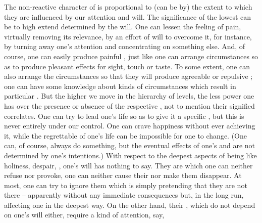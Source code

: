 The non-reactive character of  is proportional to (can be
 by) the extent to which they are influenced by our attention and
will.
\label{pa:SchelerZ}
The significance of the lowest  can be to high extend determined by
the will. One can lessen the feeling of pain, virtually removing its relevance,
by an effort of will to overcome it, for instance, by turning away one's
attention and concentrating on something else. And, of course, one can easily
produce painful , just like one can arrange circumstances so as
to produce pleasant effects for sight, touch or taste. To some extent, one can
also arrange the circumstances so that they will produce agreeable or repulsive
; one can have some knowledge about kinds of circumstances which
result in particular .  But the higher we move in the hierarchy of
levels, the less power one has over the presence or absence of the respective
, not to mention their signified correlates. One can try to lead one's
life so as to give it a specific , but this  is never
entirely under our control. One can crave happiness without ever achieving it,
while the regrettable  of one's life can be impossible for one to
change. (One can, of course, always do something, but the eventual effects of
one's  and  are not determined by one's intentions.) With
respect to the deepest aspects of being like holiness, despair, , one's
will has nothing to say. They are  which one can neither refuse nor
provoke, one can neither cause their  nor make them disappear. At
most, one can try to ignore them which is simply pretending that they are not
there -- apparently without any immediate consequences but, in the long run,
affecting one in the deepest way. On the other hand, their ,
which do not depend on one's will either, require a kind of attention, say,
